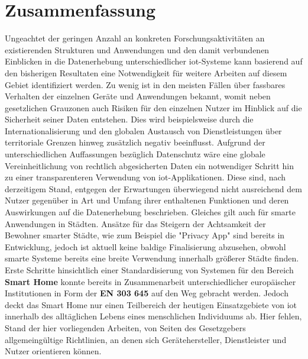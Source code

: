 
\section{Zusammenfassung}
\label{sec:Zusammenfassung}
Ungeachtet der geringen Anzahl an konkreten Forschungsaktivitäten an existierenden Strukturen und Anwendungen und den damit verbundenen Einblicken in die Datenerhebung unterschiedlicher \ac{iot}-Systeme kann basierend auf den bisherigen Resultaten eine Notwendigkeit für weitere Arbeiten auf diesem Gebiet identifiziert werden. Zu wenig ist in den meisten Fällen über fassbares Verhalten der einzelnen Geräte und Anwendungen bekannt, womit neben gesetzlichen Grauzonen auch Risiken für den einzelnen Nutzer im Hinblick auf die Sicherheit seiner Daten entstehen. Dies wird beispielsweise durch die Internationalisierung und den globalen Austausch von Dienstleistungen über territoriale Grenzen hinweg zusätzlich negativ beeinflusst. Aufgrund der unterschiedlichen Auffassungen bezüglich Datenschutz wäre eine globale Vereinheitlichung von rechtlich abgesicherten Daten ein notwendiger Schritt hin zu einer transparenteren Verwendung von \ac{iot}-Applikationen.
Diese sind, nach derzeitigem Stand, entgegen der Erwartungen überwiegend nicht ausreichend dem Nutzer gegenüber in Art und Umfang ihrer enthaltenen Funktionen und deren Auswirkungen auf die Datenerhebung beschrieben. Gleiches gilt auch für smarte Anwendungen in Städten. Ansätze für das Steigern der Achtsamkeit der Bewohner smarter Städte, wie zum Beispiel die "Privacy App" \cite{PrivacyApp2019} sind bereits in Entwicklung, jedoch ist aktuell keine baldige Finalisierung abzusehen, obwohl smarte Systeme bereits eine breite Verwendung innerhalb größerer Städte finden.
Erste Schritte hinsichtlich einer Standardisierung von Systemen für den Bereich \textbf{Smart Home} konnte bereits in Zusammenarbeit unterschiedlicher europäischer Institutionen in Form der \textbf{EN 303 645} \cite{ETSI2020} auf den Weg gebracht werden. Jedoch deckt das Smart Home nur einen Teilbereich der heutigen Einsatzgebiete von \ac{iot} innerhalb des alltäglichen Lebens eines menschlichen Individuums ab. Hier fehlen, Stand der hier vorliegenden Arbeiten, von Seiten des Gesetzgebers allgemeingültige Richtlinien, an denen sich Gerätehersteller, Dienstleister und Nutzer orientieren können.
